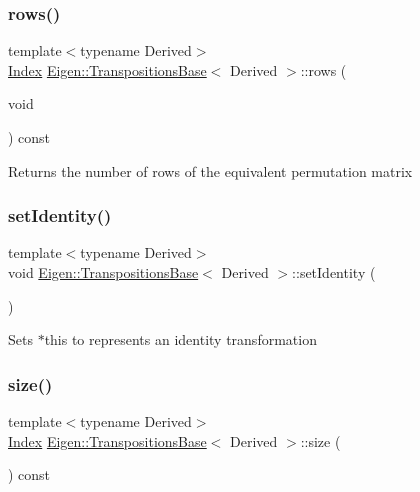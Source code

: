\subsubsection{\texorpdfstring{rows()}{rows()}}
{\footnotesize\ttfamily template$<$typename Derived$>$ \\
\mbox{\hyperlink{class_eigen_1_1_transpositions_base_a3f5f06118b419e8e6ccbe49ed5b4c91f}{Index}} \mbox{\hyperlink{class_eigen_1_1_transpositions_base}{Eigen\+::\+Transpositions\+Base}}$<$ Derived $>$\+::rows (\begin{DoxyParamCaption}\item[{void}]{ }\end{DoxyParamCaption}) const\hspace{0.3cm}{\ttfamily [inline]}}

\begin{DoxyReturn}{Returns}
the number of rows of the equivalent permutation matrix 
\end{DoxyReturn}
\mbox{\label{class_eigen_1_1_transpositions_base_a8da379438691ea694948ea5ae31d305f}} 
\subsubsection{\texorpdfstring{setIdentity()}{setIdentity()}}
{\footnotesize\ttfamily template$<$typename Derived$>$ \\
void \mbox{\hyperlink{class_eigen_1_1_transpositions_base}{Eigen\+::\+Transpositions\+Base}}$<$ Derived $>$\+::set\+Identity (\begin{DoxyParamCaption}{ }\end{DoxyParamCaption})\hspace{0.3cm}{\ttfamily [inline]}}

Sets {\ttfamily $\ast$this} to represents an identity transformation \mbox{\label{class_eigen_1_1_transpositions_base_a6888d6261a9cc24ee8607496e610a5a3}} 
\subsubsection{\texorpdfstring{size()}{size()}}
{\footnotesize\ttfamily template$<$typename Derived$>$ \\
\mbox{\hyperlink{class_eigen_1_1_transpositions_base_a3f5f06118b419e8e6ccbe49ed5b4c91f}{Index}} \mbox{\hyperlink{class_eigen_1_1_transpositions_base}{Eigen\+::\+Transpositions\+Base}}$<$ Derived $>$\+::size (\begin{DoxyParamCaption}{ }\end{DoxyParamCaption}) const\hspace{0.3cm}{\ttfamily [inline]}}

